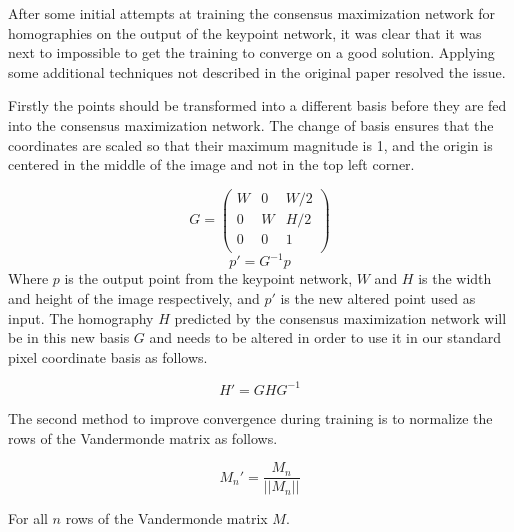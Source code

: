 After some initial attempts at training the consensus maximization network for homographies on the output of the keypoint network, it was clear that it was next to impossible to get the training to converge on a good solution. Applying some additional techniques not described in the original paper resolved the issue.

Firstly the points should be transformed into a different basis before they are fed into the consensus maximization network. The change of basis ensures that the coordinates are scaled so that their maximum magnitude is 1, and the origin is centered in the middle of the image and not in the top left corner.

\[
G=
\begin{pmatrix}
W & 0 & W/2 \\
0 & W & H/2 \\
0 & 0 & 1 \\
\end{pmatrix}
\]
\[
p' = G^{-1} p
\]
Where $p$ is the output point from the keypoint network, $W$ and $H$ is the width and height of the image respectively, and $p'$ is the new altered point used as input. The homography $H$ predicted by the consensus maximization network will be in this new basis $G$ and needs to be altered in order to use it in our standard pixel coordinate basis as follows.

\[
H' = G H G^{-1}
\]

The second method to improve convergence during training is to normalize the rows of the Vandermonde matrix as follows.

\[
M_n' = \frac{M_n}{||M_n||}
\]

For all $n$ rows of the Vandermonde matrix $M$.





